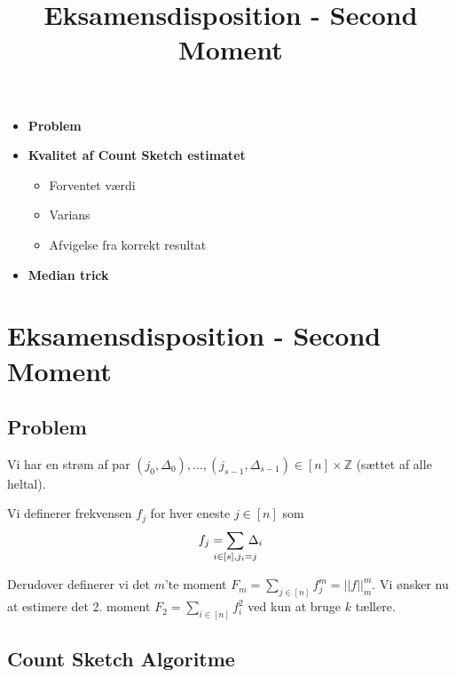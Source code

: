 
\title{Eksamensdisposition - Second Moment}


\maketitle

\begin{itemize}
  \item \textbf{Problem}
  \item \textbf{Kvalitet af Count Sketch estimatet}
  \begin{itemize}
    \item Forventet værdi
    \item Varians
    \item Afvigelse fra korrekt resultat
  \end{itemize}
  \item \textbf{Median trick}
\end{itemize}




\newpage
\section{Eksamensdisposition - Second Moment}

\subsection{Problem}

Vi har en strøm af par $(j_0, \Delta_0), \dots, (j_{s-1}, \Delta_{s-1}) \in [n]\times \mathbb Z$ (sættet af alle heltal).

Vi definerer frekvensen $f_j$ for hver eneste $j \in [n]$ som
$$
f_j = \summ{i \in [s], j_i = j} \, \Delta_i
$$

Derudover definerer vi det $m$'te moment $F_m = \sum_{j \in [n]} f_j^m = ||f||_m^m$. Vi ønsker nu at estimere det 2. moment $F_2 = \sum_{i \in [n]} f_i^2$ ved kun at bruge $k$ tællere.



\subsection{Count Sketch Algoritme}

